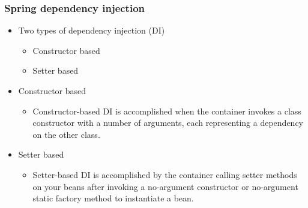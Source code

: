 \documentclass[10pt,xcolor=pdflatex, table]{beamer}
\begin{document}
\begin{frame}\frametitle{Spring dependency injection}
	\begin{itemize}
		\item Two types of dependency injection (DI)
          \begin{itemize}
        	\item Constructor based
        	\item Setter based
          \end{itemize}
		\item Constructor based
          \begin{itemize}
        	\item Constructor-based DI is accomplished when the container invokes a class constructor with a number of arguments, each representing a dependency on the other class.
          \end{itemize}
		\item Setter based
          \begin{itemize}
            \item Setter-based DI is accomplished by the container calling setter methods on your beans after invoking a no-argument constructor or no-argument static factory method to instantiate a bean.
          \end{itemize}
	\end{itemize}
\end{frame}
\end{document}
